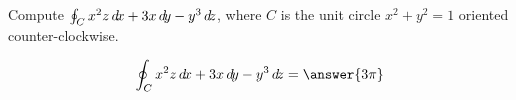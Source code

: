 \documentclass{ximera}
\author{David Guichard \and Neal Koblitz \and H. Jerome Keisler \and Albert Scheller \and Barry Balof \and Mike Wills \and Matthew Carr}
\begin{document}
\begin{exercise}




Compute $\oint_{C}x^2 z\mathop{}\!d\! x+3x\mathop{}\!d\! y-y^3\mathop{}\!d\! z$, where $C$ is the unit
circle $x^2+y^2=1$ oriented counter-clockwise.

\begin{prompt}
\[
\oint_{C}x^2 z\d x+3x\d y-y^3\d z=\answer{3\pi}
\]
\end{prompt}


\end{exercise}
\end{document}
